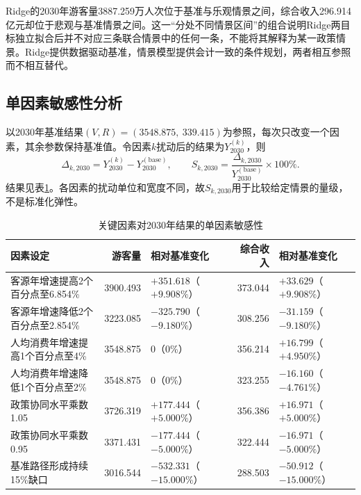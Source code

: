 \documentclass[withoutpreface,bwprint]{cumcmthesis}
\begin{document}
Ridge的2030年游客量3887.259万人次位于基准与乐观情景之间，综合收入296.914亿元却位于悲观与基准情景之间。这一“分处不同情景区间”的组合说明Ridge两目标独立拟合后并不对应三条联合情景中的任何一条，不能将其解释为某一政策情景。Ridge提供数据驱动基准，情景模型提供会计一致的条件规划，两者相互参照而不相互替代。

\subsection{单因素敏感性分析}

以2030年基准结果$(V,R)=(3548.875,\ 339.415)$为参照，每次只改变一个因素，其余参数保持基准值。令因素$k$扰动后的结果为$Y_{2030}^{(k)}$，则
\begin{equation}
\Delta_{k,2030}=Y_{2030}^{(k)}-Y_{2030}^{(\mathrm{base})},
\qquad
S_{k,2030}=\frac{\Delta_{k,2030}}
{Y_{2030}^{(\mathrm{base})}}\times100\%.
\label{eq:oat_sensitivity}
\end{equation}
结果见表\ref{tab:q3_sensitivity}。各因素的扰动单位和宽度不同，故$S_{k,2030}$用于比较给定情景的量级，不是标准化弹性。

\begin{table}[H]
\centering
\caption{关键因素对2030年结果的单因素敏感性}
\label{tab:q3_sensitivity}
\scriptsize
\renewcommand{\arraystretch}{1.12}
\begin{tabularx}{\textwidth}{p{4.2cm}rXrX}
\toprule
因素设定 & 游客量 & 相对基准变化 & 综合收入 & 相对基准变化 \\
\midrule
客源年增速提高2个百分点至6.854\% & 3900.493 & $+351.618$（$+9.908\%$） & 373.044 & $+33.629$（$+9.908\%$） \\
客源年增速降低2个百分点至2.854\% & 3223.085 & $-325.790$（$-9.180\%$） & 308.256 & $-31.159$（$-9.180\%$） \\
人均消费年增速提高1个百分点至4\% & 3548.875 & 0（0\%） & 356.214 & $+16.799$（$+4.950\%$） \\
人均消费年增速降低1个百分点至2\% & 3548.875 & 0（0\%） & 323.255 & $-16.160$（$-4.761\%$） \\
政策协同水平乘数1.05 & 3726.319 & $+177.444$（$+5.000\%$） & 356.386 & $+16.971$（$+5.000\%$） \\
政策协同水平乘数0.95 & 3371.431 & $-177.444$（$-5.000\%$） & 322.444 & $-16.971$（$-5.000\%$） \\
基准路径形成持续15\%缺口 & 3016.544 & $-532.331$（$-15.000\%$） & 288.503 & $-50.912$（$-15.000\%$） \\
\bottomrule
\end{tabularx}
\end{table}
\end{document}
